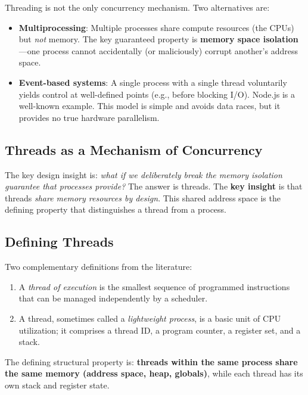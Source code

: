 \documentclass[11pt]{article}
\begin{document}
Threading is not the only concurrency mechanism. Two alternatives are:

\begin{itemize}
    \item \textbf{Multiprocessing}: Multiple processes share compute resources (the CPUs) but \emph{not} memory. The key guaranteed property is \textbf{memory space isolation}---one process cannot accidentally (or maliciously) corrupt another's address space.
    \item \textbf{Event-based systems}: A single process with a single thread voluntarily yields control at well-defined points (e.g., before blocking I/O). Node.js is a well-known example. This model is simple and avoids data races, but it provides no true hardware parallelism.
\end{itemize}

\subsection{Threads as a Mechanism of Concurrency}

The key design insight is: \emph{what if we deliberately break the memory isolation guarantee that processes provide?} The answer is threads. The \textbf{key insight} is that threads \emph{share memory resources by design}. This shared address space is the defining property that distinguishes a thread from a process.

\subsection{Defining Threads}

Two complementary definitions from the literature:

\begin{enumerate}
    \item A \emph{thread of execution} is the smallest sequence of programmed instructions that can be managed independently by a scheduler.
    \item A thread, sometimes called a \emph{lightweight process}, is a basic unit of CPU utilization; it comprises a thread ID, a program counter, a register set, and a stack.
\end{enumerate}

The defining structural property is: \textbf{threads within the same process share the same memory (address space, heap, globals)}, while each thread has its own stack and register state.
\end{document}
